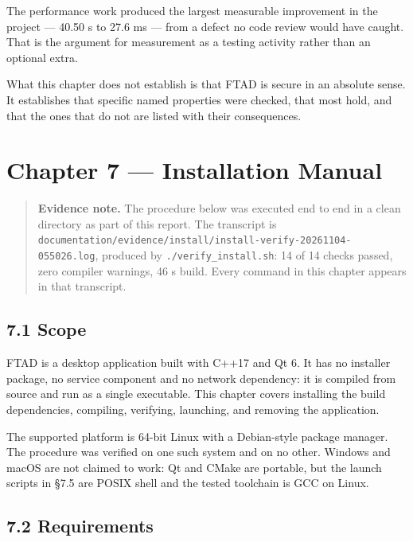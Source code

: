 \documentclass[
  12pt,
]{report}
\begin{document}
The performance work produced the largest measurable improvement in the
project --- 40.50 s to 27.6 ms --- from a defect no code review would
have caught. That is the argument for measurement as a testing activity
rather than an optional extra.

What this chapter does not establish is that FTAD is secure in an
absolute sense. It establishes that specific named properties were
checked, that most hold, and that the ones that do not are listed with
their consequences.

\chapter{Chapter 7 --- Installation
Manual}\label{chapter-7-installation-manual}

\begin{quote}
\textbf{Evidence note.} The procedure below was executed end to end in a
clean directory as part of this report. The transcript is
\texttt{documentation/\allowbreak{}evidence/\allowbreak{}install/\allowbreak{}install-verify-20261104-055026.log},
produced by \texttt{./\allowbreak{}verify\_install.sh}: 14 of 14 checks passed, zero
compiler warnings, 46 s build. Every command in this chapter appears in
that transcript.
\end{quote}

\section{7.1 Scope}\label{scope}

FTAD is a desktop application built with C++17 and Qt 6. It has no
installer package, no service component and no network dependency: it is
compiled from source and run as a single executable. This chapter covers
installing the build dependencies, compiling, verifying, launching, and
removing the application.

The supported platform is 64-bit Linux with a Debian-style package
manager. The procedure was verified on one such system and on no other.
Windows and macOS are not claimed to work: Qt and CMake are portable,
but the launch scripts in §7.5 are POSIX shell and the tested toolchain
is GCC on Linux.

\section{7.2 Requirements}\label{requirements}
\end{document}
